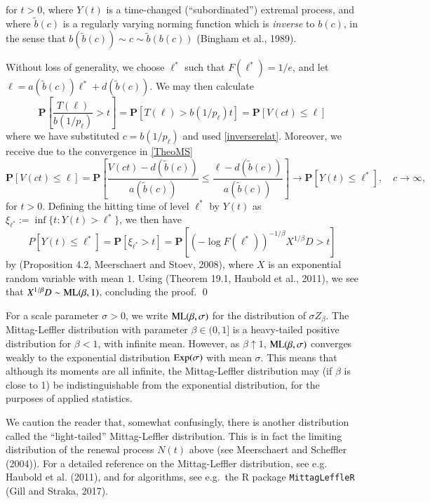 \documentclass[]{elsarticle} %
\begin{document}
for \(t > 0\), where \(Y(t)\) is a time-changed (``subordinated'')
extremal process, and where \(\tilde b(c)\) is a regularly varying
norming function which is \emph{inverse} to \(b(c)\), in the sense that
\(b(\tilde b(c)) \sim c \sim \tilde b(b(c))\) (Bingham et al., 1989).

Without loss of generality, we choose \(\ell^*\) such that
\(F(\ell^*) = 1/e\), and let
\(\ell = a(\tilde b(c)) \ell^* + d(\tilde b(c))\). We may then calculate
\[
\mathbf P\left[ \frac{T(\ell)}{b(1/p_{\ell})} > t \right]
= \mathbf P[T(\ell) > b(1/p_{\ell}) t]
= \mathbf P[V(ct) \le \ell]
\] where we have substituted \(c = b(1/p_{\ell})\) and used
\eqref{inverserelat}. Moreover, we receive due to the convergence in
\eqref{TheoMS} \[
\mathbf P[V(ct) \le \ell]
= \mathbf P\left[ \frac{V(ct) - d(\tilde b(c))}{a(\tilde b(c))} 
\le \frac{\ell - d(\tilde b(c))}{a(\tilde b(c))} \right]
\longrightarrow \mathbf P\left[ Y(t) \le \ell^* \right] ,  \quad c \to \infty,
\] for \(t>0\). Defining the hitting time of level \(\ell^*\) by
\(Y(t)\) as \(\xi_{\ell^*} := \inf\{t: Y(t) > \ell^*\}\), we then have
\[
P\left[ Y(t) \le \ell^* \right] = \mathbf P[\xi_{\ell^*} > t] 
= \mathbf P[(-\log F(\ell^*))^{-1/\beta} X^{1/\beta} D > t]
\] by (Proposition 4.2, Meerschaert and Stoev, 2008), where \(X\) is an
exponential random variable with mean \(1\). Using (Theorem 19.1,
Haubold et al., 2011), we see that
\(X^{1/\beta} D \sim {\rm ML}(\beta, 1)\), concluding the proof. \qed  

For a scale parameter \(\sigma > 0\), we write
\({\rm ML}(\beta, \sigma)\) for the distribution of \(\sigma Z_\beta\).
The Mittag-Leffler distribution with parameter \(\beta \in (0,1]\) is a
heavy-tailed positive distribution for \(\beta < 1\), with infinite
mean. However, as \(\beta \uparrow 1\), \({\rm ML}(\beta, \sigma)\)
converges weakly to the exponential distribution \({\rm Exp}(\sigma)\)
with mean \(\sigma\). This means that although its moments are all
infinite, the Mittag-Leffler distribution may (if \(\beta\) is close to
1) be indistinguishable from the exponential distribution, for the
purposes of applied statistics.

We caution the reader that, somewhat confusingly, there is another
distribution called the ``light-tailed'' Mittag-Leffler distribution.
This is in fact the limiting distribution of the renewal process
\(N(t)\) above (see Meerschaert and Scheffler (2004)). For a detailed
reference on the Mittag-Leffler distribution, see e.g.~ Haubold et al.
(2011), and for algorithms, see e.g.~the R package
\texttt{MittagLeffleR} (Gill and Straka, 2017).
\end{document}

